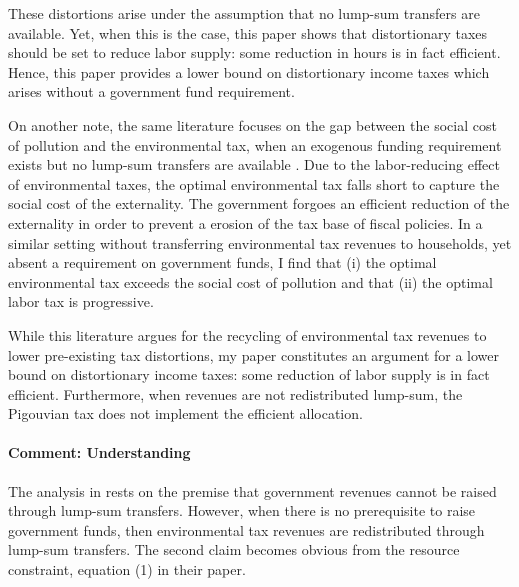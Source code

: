 
These distortions arise under the assumption that no lump-sum transfers are available. Yet, when this is the case, this paper shows that distortionary taxes should be set to reduce labor supply: some reduction in hours is in fact efficient. Hence, this paper provides a lower bound on distortionary income taxes which arises without a government fund requirement.

On another note, the same literature focuses on the gap between the social cost of pollution and the environmental tax, when an exogenous funding requirement exists but no lump-sum transfers are available \cite{LansBovenberg1994EnvironmentalTaxation, LansBovenberg1996OptimalAnalyses, Barrage2019OptimalPolicy}. 
Due to the labor-reducing effect of environmental taxes, the optimal environmental tax   falls short to capture the social cost of the externality. 
The government forgoes an efficient reduction of the externality in order to prevent a erosion of the tax base of fiscal policies. 
In a similar setting without transferring environmental tax revenues to households, yet absent a requirement on government funds, I find that (i) the optimal environmental tax exceeds the social cost of pollution and that (ii) the optimal labor tax is progressive. 

 While this literature argues for the recycling of environmental tax revenues to lower pre-existing tax distortions, my paper constitutes an argument for a lower bound on distortionary income taxes: some reduction of labor supply is in fact efficient. 
Furthermore, when revenues are not redistributed lump-sum, the Pigouvian tax does not implement the efficient allocation. 

\paragraph{Comment: Understanding \cite{LansBovenberg1994EnvironmentalTaxation}}

The analysis in \cite{LansBovenberg1994EnvironmentalTaxation} rests on the premise that government revenues cannot be raised through lump-sum transfers. However, when there is no prerequisite to raise government funds, then environmental tax revenues are redistributed through lump-sum transfers. The second claim becomes obvious from the resource constraint, equation (1) in their paper. 

